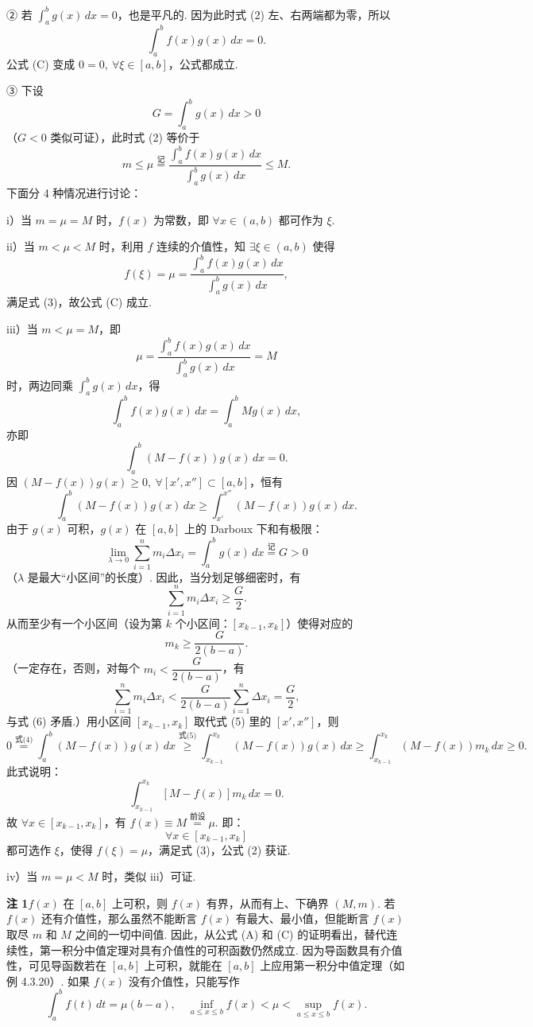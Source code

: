 \documentclass[UTF8, 12pt, fontset=fandol, oneside]{ctexart}
\begin{document}
② 若 $\displaystyle\int_a^b g(x)\,dx=0$，也是平凡的. 因为此时式 (2) 左、右两端都为零，所以
\[
\int_a^b f(x)g(x)\,dx=0.
\]
公式 (C) 变成 $0=0,\ \forall\xi\in[a,b]$，公式都成立.

③ 下设
\[
G=\int_a^b g(x)\,dx>0
\]
（$G<0$ 类似可证），此时式 (2) 等价于
\[
m\le \mu\stackrel{\text{记}}{=}
\frac{\displaystyle\int_a^b f(x)g(x)\,dx}{\displaystyle\int_a^b g(x)\,dx}\le M.
\tag{3}
\]
下面分 4 种情况进行讨论：

i）当 $m=\mu=M$ 时，$f(x)$ 为常数，即 $\forall x\in(a,b)$ 都可作为 $\xi$.

ii）当 $m<\mu<M$ 时，利用 $f$ 连续的介值性，知 $\exists\xi\in(a,b)$ 使得
\[
f(\xi)=\mu=
\frac{\displaystyle\int_a^b f(x)g(x)\,dx}{\displaystyle\int_a^b g(x)\,dx},
\]
满足式 (3)，故公式 (C) 成立.

iii）当 $m<\mu=M$，即
\[
\mu=\frac{\displaystyle\int_a^b f(x)g(x)\,dx}{\displaystyle\int_a^b g(x)\,dx}=M
\]
时，两边同乘 $\displaystyle\int_a^b g(x)\,dx$，得
\[
\int_a^b f(x)g(x)\,dx=\int_a^b Mg(x)\,dx,
\]
亦即
\[
\int_a^b(M-f(x))g(x)\,dx=0.
\tag{4}
\]
因 $(M-f(x))g(x)\ge0,\ \forall[x',x'']\subset[a,b]$，恒有
\[
\int_a^b(M-f(x))g(x)\,dx\ge
\int_{x'}^{x''}(M-f(x))g(x)\,dx.
\tag{5}
\]
由于 $g(x)$ 可积，$g(x)$ 在 $[a,b]$ 上的 Darboux 下和有极限：
\[
\lim_{\lambda\to0}\sum_{i=1}^n m_i\Delta x_i
=\int_a^b g(x)\,dx\stackrel{\text{记}}{=}G>0
\]
（$\lambda$ 是最大“小区间”的长度）. 因此，当分划足够细密时，有
\[
\sum_{i=1}^n m_i\Delta x_i\ge\frac G2.
\tag{6}
\]
从而至少有一个小区间（设为第 $k$ 个小区间：$[x_{k-1},x_k]$）使得对应的
\[
m_k\ge\frac{G}{2(b-a)}.
\tag{7}
\]
（一定存在，否则，对每个 $m_i<\dfrac{G}{2(b-a)}$，有
\[
\sum_{i=1}^n m_i\Delta x_i<
\frac{G}{2(b-a)}\sum_{i=1}^n\Delta x_i=\frac G2,
\]
与式 (6) 矛盾.）用小区间 $[x_{k-1},x_k]$ 取代式 (5) 里的 $[x',x'']$，则
\[
0\stackrel{\text{式(4)}}{=}\int_a^b(M-f(x))g(x)\,dx
\stackrel{\text{式(5)}}{\ge}
\int_{x_{k-1}}^{x_k}(M-f(x))g(x)\,dx
\ge\int_{x_{k-1}}^{x_k}(M-f(x))m_k\,dx\ge0.
\]
此式说明：
\[
\int_{x_{k-1}}^{x_k}[M-f(x)]m_k\,dx=0.
\]
故 $\forall x\in[x_{k-1},x_k]$，有 $f(x)\equiv M\stackrel{\text{前设}}{=}\mu$. 即：
\[
\forall x\in[x_{k-1},x_k]
\]
都可选作 $\xi$，使得 $f(\xi)=\mu$，满足式 (3)，公式 (2) 获证.

iv）当 $m=\mu<M$ 时，类似 iii）可证.

\noindent\textbf{注 1}\quad $f(x)$ 在 $[a,b]$ 上可积，则 $f(x)$ 有界，从而有上、下确界 $(M,m)$. 若 $f(x)$ 还有介值性，那么虽然不能断言 $f(x)$ 有最大、最小值，但能断言 $f(x)$ 取尽 $m$ 和 $M$ 之间的一切中间值. 因此，从公式 (A) 和 (C) 的证明看出，替代连续性，第一积分中值定理对具有介值性的可积函数仍然成立. 因为导函数具有介值性，可见导函数若在 $[a,b]$ 上可积，就能在 $[a,b]$ 上应用第一积分中值定理（如例 4.3.20）. 如果 $f(x)$ 没有介值性，只能写作
\[
\int_a^b f(t)\,dt=\mu(b-a),\quad
\inf_{a\le x\le b}f(x)<\mu<\sup_{a\le x\le b}f(x).
\]
\end{document}
